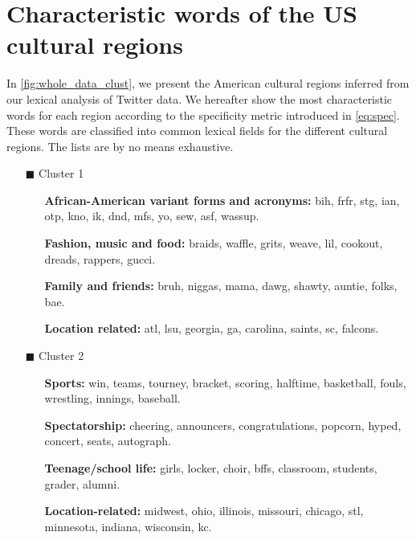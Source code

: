 \documentclass[../thesis.tex]{subfiles}
\begin{document}
\chapter{Characteristic words of the US cultural regions}
\label{ch:appendix_acr_words}

In \cref{fig:whole_data_clust}, we present the American cultural regions inferred from
our lexical analysis of Twitter data. We hereafter show the most characteristic words
for each region according to the specificity metric introduced in \cref{eq:spec}.
These words are classified into common lexical fields for the different cultural
regions. The lists are by no means exhaustive.

\begin{itemize}
  \item[\color{tol1}$\blacksquare$] Cluster 1
  \begin{itemize}
    \item[] \textbf{African-American variant forms and acronyms:} bih, frfr, stg, ian, otp, kno, ik, dnd, mfs, yo, sew, asf, wassup.
    \item[] \textbf{Fashion, music and food:} braids, waffle, grits, weave, lil, cookout, dreads, rappers, gucci.
    \item[] \textbf{Family and friends:} bruh, niggas, mama, dawg, shawty, auntie, folks, bae.
    \item[] \textbf{Location related:} atl, lsu, georgia, ga, carolina, saints, sc, falcons.
  \end{itemize}

  \item[\color{tol4}$\blacksquare$] Cluster 2
  \begin{itemize}
    \item[] \textbf{Sports:} win, teams, tourney, bracket, scoring, halftime, basketball, fouls, wrestling, innings, baseball.
    \item[] \textbf{Spectatorship:} cheering, announcers, congratulations, popcorn, hyped, concert, seats, autograph.
    \item[] \textbf{Teenage/school life:} girls, locker, choir, bffs, classroom, students, grader, alumni.
    \item[] \textbf{Location-related:} midwest, ohio, illinois, missouri, chicago, stl, minnesota, indiana, wisconsin, kc.
  \end{itemize}
  

\end{itemize}
\end{document}
